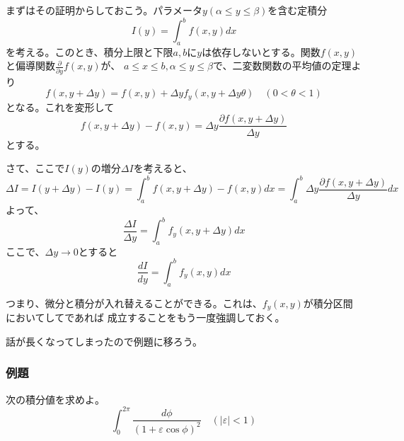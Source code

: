 \documentclass[a4j,dvipdfmx]{jsarticle}
\begin{document}
まずはその証明からしておこう。パラメータ$y(\alpha\leq y\leq \beta)$を含む定積分
\begin{equation*}
    I(y)=\int_a^b f(x,y)dx
\end{equation*}
を考える。このとき、積分上限と下限$a,b$に$y$は依存しないとする。関数$f(x,y)$と偏導関数$\displaystyle\frac{\partial}{\partial y}f(x,y)$が、
$a\leq x\leq b,\alpha\leq y\leq\beta$で、二変数関数の平均値の定理より
\begin{equation*}
    f(x,y+\Delta y)=f(x,y)+\Delta yf_y(x,y+\Delta y\theta)\quad(0<\theta<1)
\end{equation*}
となる。これを変形して
\begin{equation*}
    f(x,y+\Delta y)-f(x,y)=\Delta y\frac{\partial f(x,y+\Delta y)}{\Delta y}
\end{equation*}
とする。

さて、ここで$I(y)$の増分$\Delta I$を考えると、
\begin{equation*}
    \Delta I=I(y+\Delta y)-I(y)=\int_a^b f(x,y+\Delta y)-f(x,y)dx=\int_a^b \Delta y\frac{\partial f(x,y+\Delta y)}{\Delta y}dx
\end{equation*}
よって、
\begin{equation*}
    \frac{\Delta I}{\Delta y}=\int_a^b f_y(x,y+\Delta y)dx
\end{equation*}
ここで、$\Delta y\to 0$とすると
\begin{equation*}
    \frac{dI}{dy}=\int_a^b f_y(x,y)dx
\end{equation*}

つまり、微分と積分が入れ替えることができる。これは、$f_y(x,y)$が積分区間においてしてであれば
成立することをもう一度強調しておく。

話が長くなってしまったので例題に移ろう。
\subsubsection*{例題}
次の積分値を求めよ。
\begin{equation*}
    \int_0^{2\pi} \frac{d\phi}{(1+\varepsilon \cos \phi)^2}\quad(|\varepsilon|<1)
\end{equation*}
\end{document}
